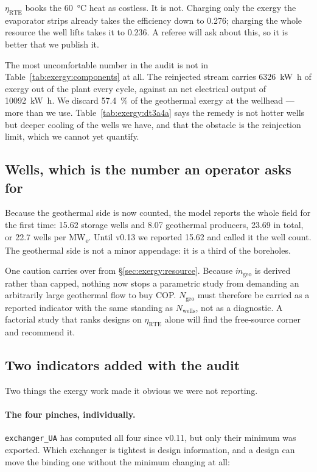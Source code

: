 $\eta_{\mathrm{RTE}}$ books the \SI{60}{\celsius} heat as costless. It is not.
Charging only the exergy the evaporator strips already takes the efficiency
down to \num{0.276}; charging the whole resource the well lifts takes it to
\num{0.236}. A referee will ask about this, so it is better that we publish
it.

The most uncomfortable number in the audit is not in
Table~\ref{tab:exergy:components} at all. The reinjected stream carries
\SI{6326}{\kilo\watt\hour} of exergy out of the plant every cycle, against an
net electrical output of \SI{10092}{\kilo\watt\hour}. We discard
\SI{57.4}{\percent} of the geothermal exergy at the wellhead --- more than we
use. Table~\ref{tab:exergy:dt3a4a} says the remedy is not hotter wells but
deeper cooling of the wells we have, and that the obstacle is the reinjection
limit, which we cannot yet quantify.

\subsection{Wells, which is the number an operator asks for}
\label{sec:exergy:wells}

Because the geothermal side is now counted, the model reports the whole field
for the first time: \num{15.62} storage wells and \num{8.07} geothermal
producers, \num{23.69} in total, or \num{22.7} wells per MW\textsubscript{e}.
Until v0.13 we reported \num{15.62} and called it the well count. The
geothermal side is not a minor appendage: it is a third of the boreholes.

One caution carries over from \S\ref{sec:exergy:resource}. Because
$\dot m_{\mathrm{geo}}$ is derived rather than capped, nothing now stops a
parametric study from demanding an arbitrarily large geothermal flow to buy
COP. $N_{\mathrm{geo}}$ must therefore be carried as a reported indicator with
the same standing as $N_{\mathrm{wells}}$, not as a diagnostic. A factorial
study that ranks designs on $\eta_{\mathrm{RTE}}$ alone will find the
free-source corner and recommend it.

\subsection{Two indicators added with the audit}
\label{sec:exergy:kpi}

Two things the exergy work made it obvious we were not reporting.

\paragraph{The four pinches, individually.} \texttt{exchanger\_UA} has
computed all four since v0.11, but only their minimum was exported. Which
exchanger is tightest is design information, and a design can move the
binding one without the minimum changing at all:

